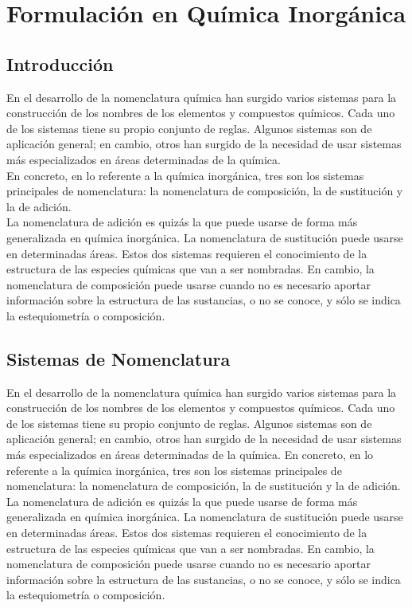 \chapter{Formulación en Química Inorgánica}

\section{Introducción}
En el desarrollo de la nomenclatura química han surgido varios sistemas para la construcción de los nombres de los elementos y compuestos químicos. Cada uno de los sistemas tiene su propio conjunto de reglas. Algunos sistemas son de aplicación general; en cambio, otros han surgido de la necesidad de usar sistemas más especializados en áreas determinadas de la química.\\
En concreto, en lo referente a la química inorgánica, tres son los sistemas principales de nomenclatura: la nomenclatura de composición, la de sustitución y la de adición.\\
La nomenclatura de adición es quizás la que puede usarse de forma más generalizada en química inorgánica. La nomenclatura de sustitución puede usarse en determinadas áreas. Estos dos sistemas requieren el conocimiento de la estructura de las especies químicas que van a ser nombradas. En cambio, la nomenclatura de composición puede usarse cuando no es necesario aportar información sobre la estructura de las sustancias, o no se conoce, y sólo se indica la estequiometría o composición.
\section{Sistemas de Nomenclatura}
En el desarrollo de la nomenclatura química han surgido varios sistemas para la construcción de los nombres de los elementos y compuestos químicos. Cada uno de los sistemas tiene su propio conjunto de reglas.
Algunos sistemas son de aplicación general; en cambio, otros han surgido de la necesidad de usar sistemas más especializados en áreas determinadas de la química.
En concreto, en lo referente a la química inorgánica, tres son los sistemas principales de nomenclatura: la nomenclatura de composición, la de sustitución y la de adición.
La nomenclatura de adición es quizás la que puede usarse de forma más generalizada en química inorgánica. La nomenclatura de sustitución puede usarse en determinadas áreas. Estos dos sistemas requieren el conocimiento de la estructura de las especies químicas que van a ser nombradas. En cambio, la nomenclatura de composición puede usarse cuando no es necesario aportar información sobre la estructura de las sustancias, o no se conoce, y sólo se indica la estequiometría o composición.
